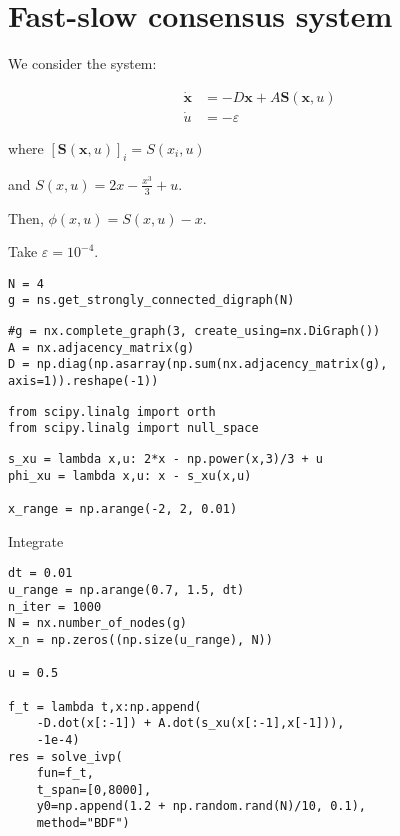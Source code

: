 \hypertarget{fast-slow-consensus-system}{%
\section{Fast-slow consensus system}\label{fast-slow-consensus-system}}

We consider the system:

\begin{equation}
\begin{aligned}
\dot{\mathbf{x}} &= -D\mathbf{x} + A\mathbf{S}(\mathbf{x}, u) \\
\dot{u} &= -\varepsilon
\end{aligned}
\end{equation}

where \([\mathbf{S}(\mathbf{x},u)]_i = S(x_i,u)\)

and \(S(x,u) = 2x - \frac{x^3}{3} + u\).

Then, \(\phi(x,u) = S(x,u) - x\).

Take \(\varepsilon = 10^{-4}\).

\begin{verbatim}
N = 4
g = ns.get_strongly_connected_digraph(N)
\end{verbatim}

\begin{verbatim}
#g = nx.complete_graph(3, create_using=nx.DiGraph())
A = nx.adjacency_matrix(g)
D = np.diag(np.asarray(np.sum(nx.adjacency_matrix(g), axis=1)).reshape(-1))
\end{verbatim}

\begin{verbatim}
from scipy.linalg import orth
from scipy.linalg import null_space
\end{verbatim}

\begin{verbatim}
s_xu = lambda x,u: 2*x - np.power(x,3)/3 + u
phi_xu = lambda x,u: x - s_xu(x,u)

x_range = np.arange(-2, 2, 0.01)
\end{verbatim}

Integrate

\begin{verbatim}
dt = 0.01
u_range = np.arange(0.7, 1.5, dt)
n_iter = 1000
N = nx.number_of_nodes(g)
x_n = np.zeros((np.size(u_range), N))

u = 0.5

f_t = lambda t,x:np.append(
    -D.dot(x[:-1]) + A.dot(s_xu(x[:-1],x[-1])),
    -1e-4)
res = solve_ivp(
    fun=f_t, 
    t_span=[0,8000], 
    y0=np.append(1.2 + np.random.rand(N)/10, 0.1), 
    method="BDF")
\end{verbatim}

